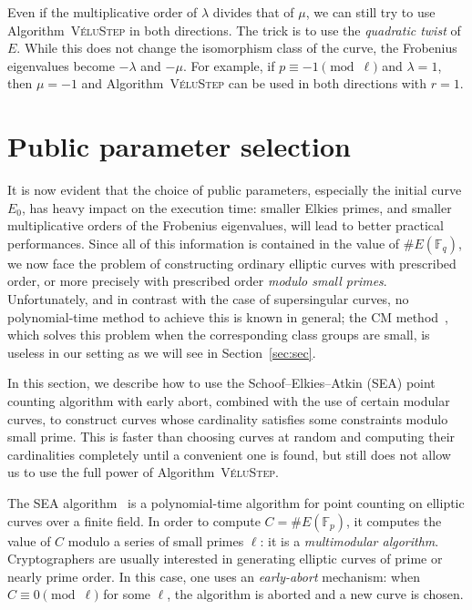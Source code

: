 \documentclass{article}
\newcommand{\F}{\mathbb{F}}
\newcommand{\algstyle}[1]{\textsc{#1}}
\theoremstyle{definition}
\begin{document}
Even if the multiplicative order of $\lambda$ divides that of $\mu$,
we can still try to use Algorithm~\algstyle{VéluStep} in both directions.
The trick is to use the \emph{quadratic twist} of $E$. While this does not
change the isomorphism class of the curve, the Frobenius eigenvalues
become $-\lambda$ and $-\mu$. For example, if
$p \equiv -1\pmod{\ell}$ and $\lambda = 1$, then $\mu=-1$ and 
Algorithm~\algstyle{VéluStep} can be used in both directions with $r=1$.

\section{Public parameter selection}
\label{sec:initcurve}

It is now evident that the choice of public parameters, especially
the initial curve $E_0$, has heavy impact on the execution time:
smaller Elkies primes,
and smaller multiplicative orders of the Frobenius eigenvalues, will
lead to better practical performances. Since all of this information
is contained in the value of $\# E(\F_q)$, we now face the problem
of constructing ordinary elliptic curves with prescribed
order, or more precisely with prescribed order \emph{modulo small
primes}. Unfortunately, and in contrast with the case of
supersingular curves, no polynomial-time method to achieve this 
is known in general; the CM method~\cite{todo:cmmethod}, which solves this problem
when the corresponding class groups are small, is useless in our
setting as we will see in Section~\ref{sec:sec}.

In this section, we describe how to use the Schoof--Elkies--Atkin (SEA) point counting
algorithm with early abort, combined with the use of certain modular curves,
to construct curves whose cardinality satisfies some constraints
modulo small prime.
This is faster than choosing curves at random and computing their cardinalities
completely until a convenient one is found, but still does not allow us
to use the full power of Algorithm~\algstyle{VéluStep}.

The SEA algorithm~\cite{schoof95,todo} is a polynomial-time algorithm for
point counting on elliptic curves over a finite field. In order to compute
$C = \# E(\F_p)$, it computes the value of $C$ modulo a series
of small primes $\ell$: it is a \emph{multimodular algorithm}.
Cryptographers are usually interested in generating elliptic curves of
prime or nearly prime order. In this case, one uses an \emph{early-abort}
mechanism: when $C \equiv 0\pmod{\ell}$ for some $\ell$, the algorithm is aborted
and a new curve is chosen.
\end{document}
